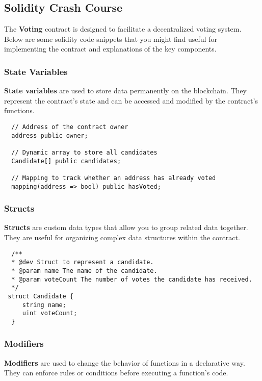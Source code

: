 \documentclass[12pt]{article}
\begin{document}
\subsection{Solidity Crash Course}

The \textbf{Voting} contract is designed to facilitate a decentralized voting system. Below are some solidity code snippets that you might find useful for implementing the contract and explanations of the key components.

\subsubsection{State Variables}

\textbf{State variables} are used to store data permanently on the blockchain. They represent the contract's state and can be accessed and modified by the contract's functions.

\begin{verbatim}
  // Address of the contract owner
  address public owner;

  // Dynamic array to store all candidates
  Candidate[] public candidates;

  // Mapping to track whether an address has already voted
  mapping(address => bool) public hasVoted;
\end{verbatim}

\subsubsection{Structs}

\textbf{Structs} are custom data types that allow you to group related data together. They are useful for organizing complex data structures within the contract.

\begin{verbatim}
  /**
  * @dev Struct to represent a candidate.
  * @param name The name of the candidate.
  * @param voteCount The number of votes the candidate has received.
  */
 struct Candidate {
     string name;
     uint voteCount;
  }
\end{verbatim}

\subsubsection{Modifiers}

\textbf{Modifiers} are used to change the behavior of functions in a declarative way. They can enforce rules or conditions before executing a function's code.
\end{document}
